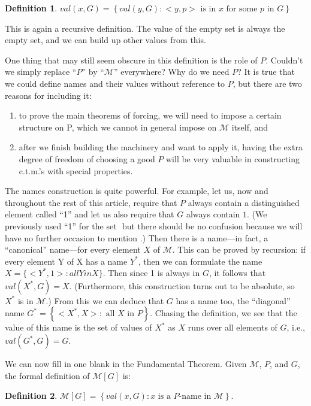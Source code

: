 \documentclass[10pt]{article}
\theoremstyle{definition}
\newtheorem*{defn}{Definition}
\begin{document}
\begin{defn}
$val(x,G) =\left\{val(y,G) : <y,p>\text{ is in }x\text{ for some }p\text{ in }G\right\}$
\end{defn}

This is again a recursive definition. The value of the empty set is always the empty set, and we can build up other values from this.

One thing that may still seem obscure in this definition is the role of $P$. Couldn't we simply replace ``$P$'' by ``$\mathcal M$'' everywhere? Why do we need $P$? It is true that we could define names and their values without reference to $P$, but there are two reasons for including it:

\begin{enumerate}
\item to prove the main theorems of forcing, we will need to impose a certain structure on P, which we cannot in general impose on $\mathcal{M}$ itself, and
\item after we finish building the machinery and want to apply it, having the extra degree of freedom of choosing a good $P$ will be very valuable in constructing c.t.m.'s with special properties.
\end{enumerate}

The names construction is quite powerful. For example, let us, now and throughout the rest of this article, require that $P$ always contain a distinguished element called ``1'' and let us also require that $G$ always contain $1$. (We previously used ``1'' for the set ${{}}$ but there should be no confusion because we will have no further occasion to mention ${{}}$.) Then there is a name---in fact, a ``canonical'' name---for every element $X$ of $\mathcal M$. This can be proved by recursion: if every element Y of X has a name $Y^*$, then we can formulate the name $X = \{<Y^*,1> : all Y in X\}$. Then since 1 is always in $G$, it follows that $val(X^*,G) = X$. (Furthermore, this construction turns out to be absolute, so $X^*$ is in $\mathcal M$.) From this we can deduce that $G$ has a name too, the ``diagonal'' name $G^* = \left\{<X^*,X> :\text{ all }X\text{ in }P\right\}$. Chasing the definition, we see that the value of this name is the set of values of $X^*$ as $X$ runs over all elements of $G$, i.e., $val(G^*,G) = G$.

We can now fill in one blank in the Fundamental Theorem. Given $\mathcal M$, $P$, and $G$, the formal definition of $\mathcal{M}[G]$ is: 

\begin{defn}
$\mathcal{M}[G] = \left\{val(x,G) : x\text{ is a }P\text{-name in }\mathcal M\right\}.$
\end{defn}
\end{document}
